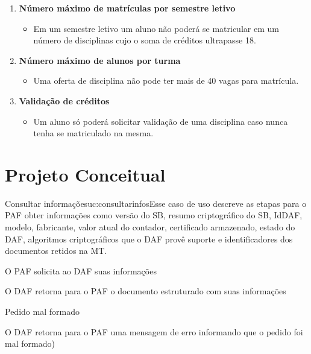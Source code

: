 \documentclass[11pt]{../../classes/ifscarticle}
\begin{document}
\begin{enumerate}
    \item \textbf{Número máximo de matrículas por semestre letivo}
    \begin{itemize}
        \item Em um semestre letivo um aluno não poderá se matricular em um número de disciplinas cujo o soma de créditos ultrapasse 18.
    \end{itemize}
    \item \textbf{Número máximo de alunos por turma}
    \begin{itemize}
        \item Uma oferta de disciplina não pode ter mais de 40 vagas para matrícula.
    \end{itemize}
    \item \textbf{Validação de créditos}
    \begin{itemize}
        \item Um aluno só poderá solicitar validação de uma disciplina caso nunca tenha se matriculado na mesma.
    \end{itemize}
\end{enumerate}


\section{Projeto Conceitual}


\begin{usecase}{Consultar informações}{uc:consultarinfos}{Esse caso de uso descreve as etapas para o PAF obter informações como versão do SB, resumo criptográfico do SB, IdDAF, modelo, fabricante, valor atual do contador, certificado armazenado, estado do DAF, algoritmos criptográficos que o DAF provê suporte e identificadores dos documentos retidos na MT.}
    \begin{cabecalhoUC}
    \end{cabecalhoUC}

    \begin{fluxoprincipal}
        \item O PAF solicita ao DAF suas informações 
        \item O DAF retorna para o PAF o documento estruturado com suas informações
    \end{fluxoprincipal}  

    \begin{fluxoexcecao}{Pedido mal formado}
        \item O DAF retorna para o PAF uma mensagem de erro informando que o pedido foi mal formado)
    \end{fluxoexcecao}   
\end{usecase}



\end{document}
